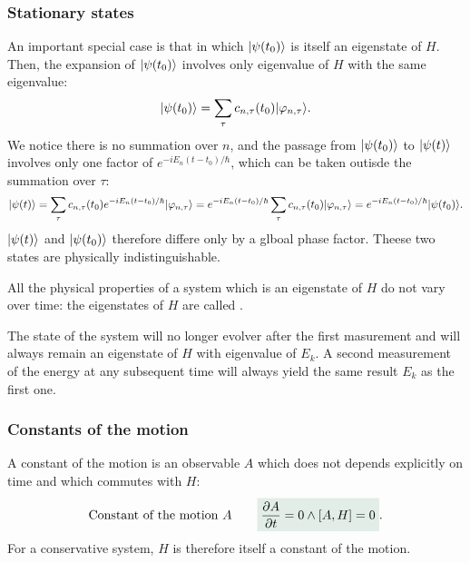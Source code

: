 \subsubsection{Stationary states}
An important special case is that in which $|\psi(t_0)\rangle$  is itself an eigenstate of $H$. Then, the expansion of $|\psi(t_0)\rangle$ involves only 
eigenvalue of $H$ with the same eigenvalue:
\begin{align*}
    |\psi(t_0)\rangle=\sum_\tau c_{n,\tau}(t_0)|\varphi_{n,\tau}\rangle.
\end{align*}
We notice there is no summation over $n$, and the passage from $|\psi(t_0)\rangle$ to $|\psi(t)\rangle$ involves only one factor of $e^{-iE_n(t-t_0)/\hbar}$,
which can be taken outisde the summation over $\tau$:
\begin{align*}
    |\psi(t)\rangle=\sum_\tau c_{n,\tau}(t_0)e^{-iE_n(t-t_0)/\hbar}|\varphi_{n,\tau}\rangle=e^{-iE_n(t-t_0)/\hbar}\sum_\tau c_{n,\tau}(t_0)|\varphi_{n,\tau}\rangle=e^{-iE_n(t-t_0)/\hbar}|\psi(t_0)\rangle.
\end{align*}
$|\psi(t)\rangle$ and $|\psi(t_0)\rangle$ therefore differe only by a glboal phase factor. Theese two states are physically indistinguishable.
\begin{emphasizer}
    All the physical properties of a system which is an eigenstate of $H$ do not vary over time: the eigenstates of $H$ are called .
\end{emphasizer}
The state of the system will no longer evolver after the first masurement and will always remain an eigenstate of $H$ with eigenvalue of $E_k$.
A second measurement of the energy at any subsequent time will always yield the same result $E_k$ as the first one.
\subsubsection{Constants of the motion}
A constant of the motion is an observable $A$ which does not depends explicitly on time and which commutes with $H$:
\begin{align}
    \text{Constant of the motion $A$}\qquad
    \highlight{\frac{\partial A}{\partial t}=0\land[A,H]=0}.
\end{align}
For a conservative system, $H$ is therefore itself a constant of the motion.

